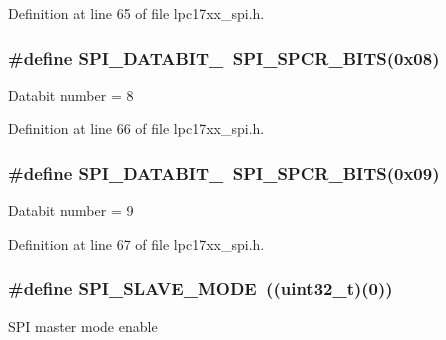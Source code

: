 \-Definition at line 65 of file lpc17xx\-\_\-spi.\-h.

\hypertarget{group___s_p_i___public___macros_gadc25db268d711c7ad851bd13fde9e514}{
\subsubsection[{\-S\-P\-I\-\_\-\-D\-A\-T\-A\-B\-I\-T\-\_\-8}]{\setlength{\rightskip}{0pt plus 5cm}\#define {\bf \-S\-P\-I\-\_\-\-D\-A\-T\-A\-B\-I\-T\-\_}~{\bf \-S\-P\-I\-\_\-\-S\-P\-C\-R\-\_\-\-B\-I\-T\-S}(0x08)}}\label{group___s_p_i___public___macros_gadc25db268d711c7ad851bd13fde9e514}
\-Databit number = 8 

\-Definition at line 66 of file lpc17xx\-\_\-spi.\-h.

\hypertarget{group___s_p_i___public___macros_ga4f71f34d3949f5e94ebdc0e9b2e98c4f}{
\subsubsection[{\-S\-P\-I\-\_\-\-D\-A\-T\-A\-B\-I\-T\-\_\-9}]{\setlength{\rightskip}{0pt plus 5cm}\#define {\bf \-S\-P\-I\-\_\-\-D\-A\-T\-A\-B\-I\-T\-\_}~{\bf \-S\-P\-I\-\_\-\-S\-P\-C\-R\-\_\-\-B\-I\-T\-S}(0x09)}}\label{group___s_p_i___public___macros_ga4f71f34d3949f5e94ebdc0e9b2e98c4f}
\-Databit number = 9 

\-Definition at line 67 of file lpc17xx\-\_\-spi.\-h.

\hypertarget{group___s_p_i___public___macros_ga6937829c8e8c6b3907faed0da21faa6c}{
\subsubsection[{\-S\-P\-I\-\_\-\-S\-L\-A\-V\-E\-\_\-\-M\-O\-D\-E}]{\setlength{\rightskip}{0pt plus 5cm}\#define {\bf \-S\-P\-I\-\_\-\-S\-L\-A\-V\-E\-\_\-\-M\-O\-D\-E}~((uint32\-\_\-t)(0))}}\label{group___s_p_i___public___macros_ga6937829c8e8c6b3907faed0da21faa6c}
\-S\-P\-I master mode enable 

